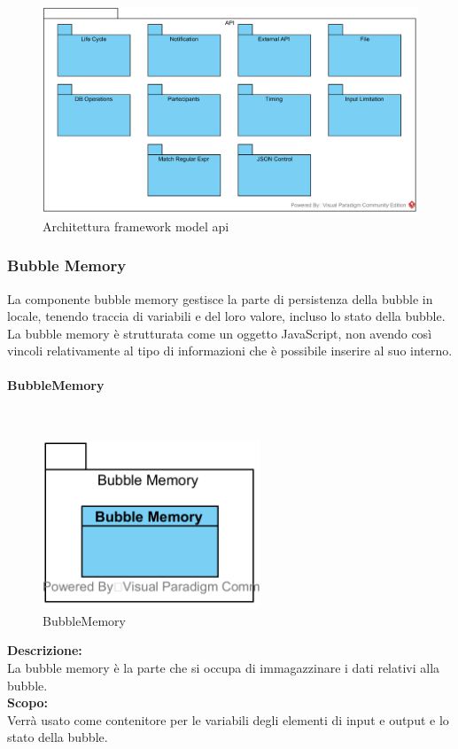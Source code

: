 \begin{figure}[H]
	\centering
	\includegraphics[width=14cm]{diagrammi_img/classi_e_package/framework_api_package.png}
	\caption{Architettura framework model api}
\end{figure}

\subsubsection{Bubble Memory}
La componente bubble memory gestisce la parte di persistenza della bubble in locale, tenendo traccia di variabili e del loro valore, incluso lo stato della bubble. La bubble memory è strutturata come un oggetto JavaScript, non avendo così vincoli relativamente al tipo di informazioni che è possibile inserire al suo interno.
\begin{samepage}
	\paragraph{BubbleMemory}\label{fm-memory}\mbox{}\\
	\nopagebreak
	\begin{figure}[H]
		\centering
		\includegraphics[height=5cm]{diagrammi_img/classi_e_package/bubble_memory.png}
		\caption{BubbleMemory}
	\end{figure}	
\end{samepage}
\textbf{Descrizione:}\\
La bubble memory è la parte che si occupa di immagazzinare i dati relativi alla bubble. \\
\textbf{Scopo:}\\
Verrà usato come contenitore per le variabili degli elementi di input e output e lo stato della bubble.

